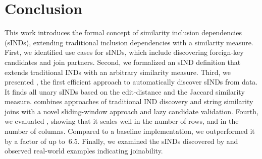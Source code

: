 \section{Conclusion}
\label{section:discussion}

This work introduces the formal concept of similarity inclusion dependencies (sINDs), extending traditional inclusion dependencies with a similarity measure.
First, we identified use cases for sINDs, which include discovering foreign-key candidates and join partners.
Second, we formalized an sIND definition that extends traditional INDs with an arbitrary similarity measure.
Third, we presented \sawfish, the first efficient approach to automatically discover sINDs from data.
It finds all unary sINDs based on the edit-distance and the Jaccard similarity measure.
\sawfish combines approaches of traditional IND discovery and string similarity joins with a novel sliding-window approach and lazy candidate validation. %
Fourth, we evaluated \sawfish, showing that it scales well in the number of rows, and in the number of columns.
Compared to a baseline implementation, we outperformed it by a factor of up to~6.5.
Finally, we examined the sINDs discovered by \sawfish and observed real-world examples indicating joinability.

